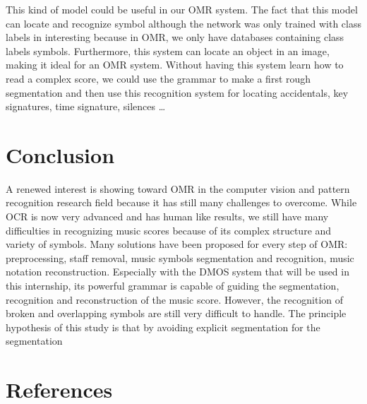 \documentclass[11pt]{sdm}
\begin{document}
This kind of model could be useful in our OMR system.
The fact that this model can locate and recognize symbol although the network was only trained with class labels in interesting because in OMR, we only have databases containing class labels symbols.
Furthermore, this system can locate an object in an image, making it ideal for an OMR system.
Without having this system learn how to read a complex score, we could use the grammar to make a first rough segmentation and then use this recognition system for locating accidentals, key signatures, time signature, silences \ldots

\section{Conclusion}

A renewed interest is showing toward OMR in the computer vision and pattern recognition research field because it has still many challenges to overcome.
While OCR is now very advanced and has human like results, we still have many difficulties in recognizing music scores because of its complex structure and variety of symbols.
Many solutions have been proposed for every step of OMR: preprocessing, staff removal, music symbols segmentation and recognition, music notation reconstruction.
Especially with the DMOS system that will be used in this internship, its powerful grammar is capable of guiding the segmentation, recognition and reconstruction of the music score.
However, the recognition of broken and overlapping symbols are still very difficult to handle.
The principle hypothesis of this study is that by avoiding explicit segmentation for the segmentation 


\section*{References}



\end{document}
